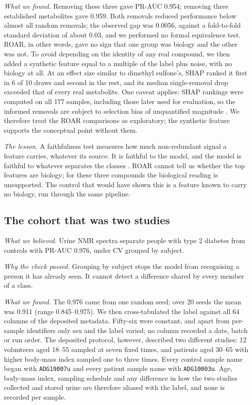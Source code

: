 \documentclass[conference]{IEEEtran}
\begin{document}
\emph{What we found.} Removing these three gave PR-AUC 0.954; removing three
established metabolites gave 0.959. Both removals reduced performance below
almost all random removals; the observed gap was 0.0056, against a
fold-to-fold standard deviation of about 0.03, and we performed no formal
equivalence test. ROAR, in other words, gave no sign that one group was
biology and the other was not. To avoid depending on the identity of any
real compound, we then added a synthetic feature equal to a multiple of the
label plus noise, with no biology at all. At an effect size similar to
dimethyl sulfone's, SHAP ranked it first in 6 of 10 draws and second in the
rest, and its median single-removal drop exceeded that of every real
metabolite. One caveat applies: SHAP rankings were computed on all 177
samples, including those later used for evaluation, so the informed
removals are subject to selection bias of unquantified magnitude
\cite{varma2006}. We therefore treat the ROAR comparisons as exploratory;
the synthetic feature supports the conceptual point without them.

\emph{The lesson.} A faithfulness test measures how much non-redundant signal
a feature carries, whatever its source. It is faithful to the model, and the
model is faithful to whatever separates the classes
\cite{adebayo2018, kumar2020}. ROAR cannot tell us whether the top features
are biology; for these three compounds the biological reading is
unsupported. The control that would have shown this is a feature known to
carry no biology, run through the same pipeline.

\subsection{The cohort that was two studies}
\label{sec:story3}

\emph{What we believed.} Urine NMR spectra separate people with type 2
diabetes from controls with PR-AUC 0.976, under CV grouped by subject.

\emph{Why the check passed.} Grouping by subject stops the model from
recognising a person it has already seen. It cannot detect a difference
shared by every member of a class.

\emph{What we found.} The 0.976 came from one random seed; over 20 seeds the
mean was 0.911 (range 0.845--0.975). We then cross-tabulated the label
against all 64 columns of the deposited metadata. Fifty-six were constant,
and apart from per-sample identifiers only sex and the label varied; no column recorded a date, batch or
run order. The deposited protocol, however, described two different
studies: 12 volunteers aged 18--55 sampled at seven fixed times, and patients
aged 30--65 with higher body-mass index sampled one to three times. Every
control sample name began with \texttt{ADG19007u} and every patient sample
name with \texttt{ADG10003u}. Age, body-mass index, sampling schedule and any
difference in how the two studies collected and stored urine are therefore
aliased with the label, and none is recorded per sample.
\end{document}
